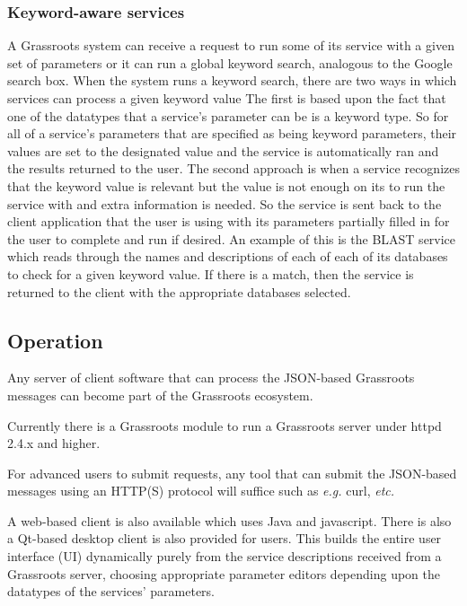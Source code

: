 \documentclass[9pt,a4paper]{extarticle}
\begin{document}
\subsubsection*{Keyword-aware services}

A Grassroots system can receive a request to run some of its service with a given set of parameters or it can run a global keyword search, analogous to the Google search box. When the system runs a keyword search, there are two ways in which services can process a given keyword value
The first is based upon the fact that one of the datatypes that a service's parameter can be is a keyword type. So for all of a service's parameters that are specified as being keyword parameters, their values are set to the designated value and the service is automatically ran and the results returned to the user. 
The second approach is when a service recognizes that the keyword value is relevant but the value is not enough on its to run the service with and extra information is needed. So the service is sent back to the client application that the user is using with its parameters partially filled in for the user to complete and run if desired. An example of this is the BLAST service which reads through the names and descriptions of each of each of its databases to check for a given keyword value. If there is a match, then the service is returned to the client with the appropriate databases selected.


\subsection*{Operation}

Any server of client software that can process the JSON-based Grassroots messages can become part of the Grassroots ecosystem. 



Currently there is a Grassroots module to run a Grassroots server under httpd 2.4.x and higher. 

For advanced users to submit requests, any tool that can submit the JSON-based messages using an HTTP(S) protocol will suffice such as \textit{e.g.} curl\cite{curl}, \textit{etc.} 

A web-based client is also available which uses Java\cite{Java} and javascript. There is also a Qt-based\cite{qt} desktop client is also provided for users. This builds the entire user interface (UI) dynamically purely from the service descriptions received from a Grassroots server, choosing appropriate parameter editors depending upon the datatypes of the services' parameters. 
\end{document}
